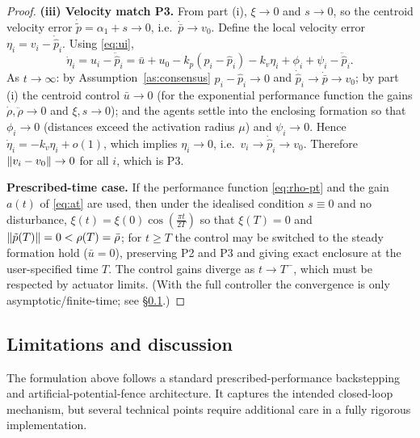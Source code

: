 \begin{proof}
\noindent\textbf{(iii) Velocity match P3.}
From part (i), $\xi\to0$ and $s\to0$, so the centroid velocity error
$\dot{\tilde p}=\alpha_1+s\to0$, i.e.\ $\dot{\bar p}\to v_0$. Define the
local velocity error $\eta_i=v_i-\dot{\hat p}_i$. Using \eqref{eq:ui},
\[
\dot\eta_i = u_i-\ddot{\hat p}_i
= \bar u + u_0 - k_p(p_i-\hat p_i) - k_v\eta_i + \phi_i + \psi_i
  - \ddot{\hat p}_i.
\]
As $t\to\infty$: by Assumption~\ref{as:consensus} $p_i-\hat p_i\to0$ and
$\dot{\hat p}_i\to\dot{\bar p}\to v_0$; by part (i) the centroid control
$\bar u\to0$ (for the exponential performance function the gains
$\dot\rho,\ddot\rho\to0$ and $\xi,s\to0$); and the agents settle into the
enclosing formation so that $\phi_i\to0$ (distances exceed the activation
radius $\mu$) and $\psi_i\to0$. Hence
$\dot\eta_i = -k_v\eta_i + o(1)$, which implies $\eta_i\to0$, i.e.\
$v_i\to\dot{\hat p}_i\to v_0$. Therefore $\lVert v_i-v_0 \rVert\to0$ for all $i$,
which is P3.

\noindent\textbf{Prescribed-time case.}
If the performance function \eqref{eq:rho-pt} and the gain $a(t)$ of
\eqref{eq:at} are used, then under the idealised condition $s\equiv0$ and no
disturbance, $\xi(t)=\xi(0)\cos(\frac{\pi t}{2T})$ so that $\xi(T)=0$ and
$\lVert \tilde p(T) \rVert=0<\rho(T)=\bar\rho$; for $t\ge T$ the control may be
switched to the steady formation hold ($\bar u=0$), preserving P2 and P3 and
giving exact enclosure at the user-specified time $T$. The control gains
diverge as $t\to T^-$, which must be respected by actuator limits. (With the
full controller the convergence is only asymptotic/finite-time; see
\S\ref{subsec:limits}.)
\end{proof}

\subsection{Limitations and discussion}
\label{subsec:limits}

The formulation above follows a standard prescribed-performance backstepping
and artificial-potential-fence architecture.  It captures the intended
closed-loop mechanism, but several technical points require additional care
in a fully rigorous implementation.

